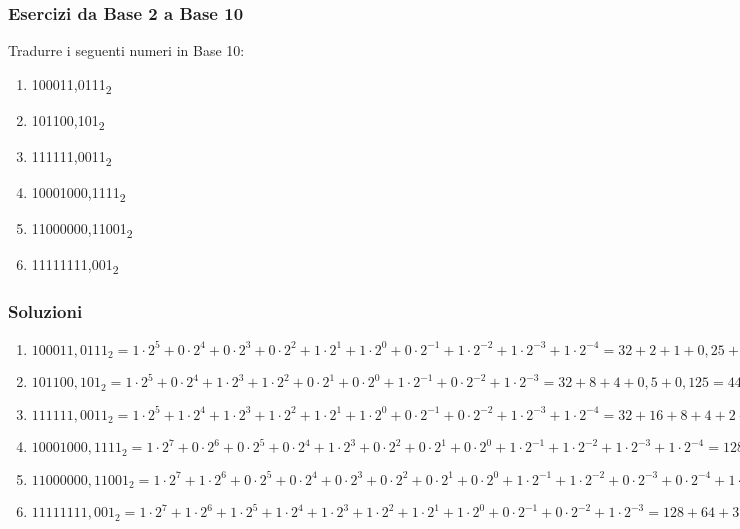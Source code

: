 \documentclass{article}
\begin{document}
\begin{enumerate}
\end{enumerate}

\subsubsection{Esercizi da Base 2 a Base 10}
Tradurre i seguenti numeri in Base 10:
\begin{enumerate}
\item 100011,0111\textsubscript{2}
\item 101100,101\textsubscript{2}
\item 111111,0011\textsubscript{2}
\item 10001000,1111\textsubscript{2}
\item 11000000,11001\textsubscript{2}
\item 11111111,001\textsubscript{2}
\end{enumerate}

\subsubsection{Soluzioni}

\begin{enumerate}
\item $100011,0111_{2}=1\cdot 2^{5}+0\cdot 2^{4}+0\cdot 2^{3}+0\cdot 2^{2}+1\cdot 2^{1}+1\cdot 2^{0}+0\cdot 2^{-1}+1\cdot 2^{-2}+1\cdot 2^{-3}+1\cdot 2^{-4}=32+2+1+0,25+0,125+0,0625=35,4375_{10}$

\item $101100,101_{2}=1\cdot 2^{5}+0\cdot 2^{4}+1\cdot 2^{3}+1\cdot 2^{2}+0\cdot 2^{1}+0\cdot 2^{0}+1\cdot 2^{-1}+0\cdot 2^{-2}+1\cdot 2^{-3}=32+8+4+0,5+0,125=44,625_{10}$

\item $111111,0011_{2}=1\cdot 2^{5}+1\cdot 2^{4}+1\cdot 2^{3}+1\cdot 2^{2}+1\cdot 2^{1}+1\cdot 2^{0}+0\cdot 2^{-1}+0\cdot 2^{-2}+1\cdot 2^{-3}+1\cdot 2^{-4}=32+16+8+4+2+1+0,125+0,0625=63,1875_{10}$

\item $10001000,1111_{2}=1\cdot 2^{7}+0\cdot 2^{6}+0\cdot 2^{5}+0\cdot 2^{4}+1\cdot 2^{3}+0\cdot 2^{2}+0\cdot 2^{1}+0\cdot 2^{0}+1\cdot 2^{-1}+1\cdot 2^{-2}+1\cdot 2^{-3}+1\cdot 2^{-4}=128+8+0,5+0,25+0,125+0,0625=136,9375_{10}$

\item $11000000,11001_{2}=1\cdot 2^{7}+1\cdot 2^{6}+0\cdot 2^{5}+0\cdot 2^{4}+0\cdot 2^{3}+0\cdot 2^{2}+0\cdot 2^{1}+0\cdot 2^{0}+1\cdot 2^{-1}+1\cdot 2^{-2}+0\cdot 2^{-3}+0\cdot 2^{-4}+1\cdot 2^{-5}=128+64+0,5+0,25+0,03125=192,78125_{10}$

\item $11111111,001_{2}=1\cdot 2^{7}+1\cdot 2^{6}+1\cdot 2^{5}+1\cdot 2^{4}+1\cdot 2^{3}+1\cdot 2^{2}+1\cdot 2^{1}+1\cdot 2^{0}+0\cdot 2^{-1}+0\cdot 2^{-2}+1\cdot 2^{-3}=128+64+32+16+8+4+2+1+0,125=255,125_{10}$
\end{enumerate}
\end{document}
